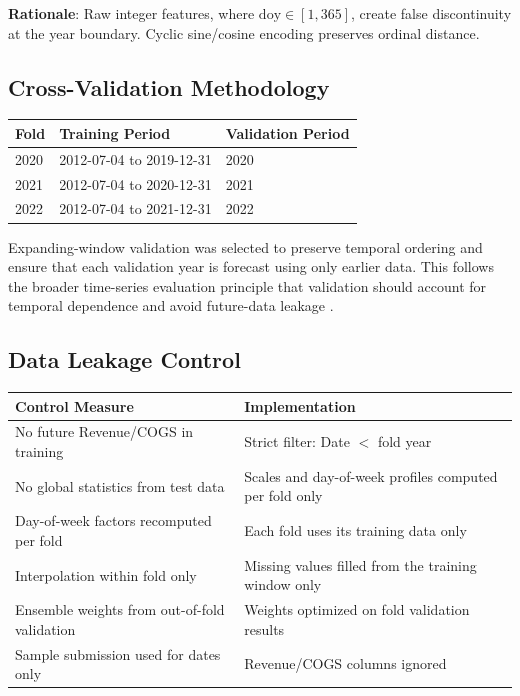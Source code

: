 \documentclass[12pt,a4paper]{article}
\begin{document}
\noindent\textbf{Rationale}: Raw integer features, where $\mathrm{doy} \in [1,365]$, create false discontinuity at the year boundary. Cyclic sine/cosine encoding preserves ordinal distance.

\subsection{Cross-Validation Methodology}
\label{sec:cross-validation-methodology}

\begin{center}
\centering
{}
\label{tab:expanding-window-cv}
\small
\begin{tabular}{lll}
\toprule
\textbf{Fold} & \textbf{Training Period} & \textbf{Validation Period} \\
\midrule
2020 & 2012-07-04 to 2019-12-31 & 2020 \\
2021 & 2012-07-04 to 2020-12-31 & 2021 \\
2022 & 2012-07-04 to 2021-12-31 & 2022 \\
\bottomrule
\end{tabular}
\end{center}

Expanding-window validation was selected to preserve temporal ordering and ensure that each validation year is forecast using only earlier data. This follows the broader time-series evaluation principle that validation should account for temporal dependence and avoid future-data leakage \cite{Bergmeir2012}.

\subsection{Data Leakage Control}
\label{sec:data-leakage-control}

\begin{center}
\centering
{}
\label{tab:data-leakage-control}
\small
\begin{tabular}{p{5.2cm}p{8.3cm}}
\toprule
\textbf{Control Measure} & \textbf{Implementation} \\
\midrule
No future Revenue/COGS in training & Strict filter: Date $<$ fold year \\
No global statistics from test data & Scales and day-of-week profiles computed per fold only \\
Day-of-week factors recomputed per fold & Each fold uses its training data only \\
Interpolation within fold only & Missing values filled from the training window only \\
Ensemble weights from out-of-fold validation & Weights optimized on fold validation results \\
Sample submission used for dates only & Revenue/COGS columns ignored \\
\bottomrule
\end{tabular}
\end{center}
\end{document}
